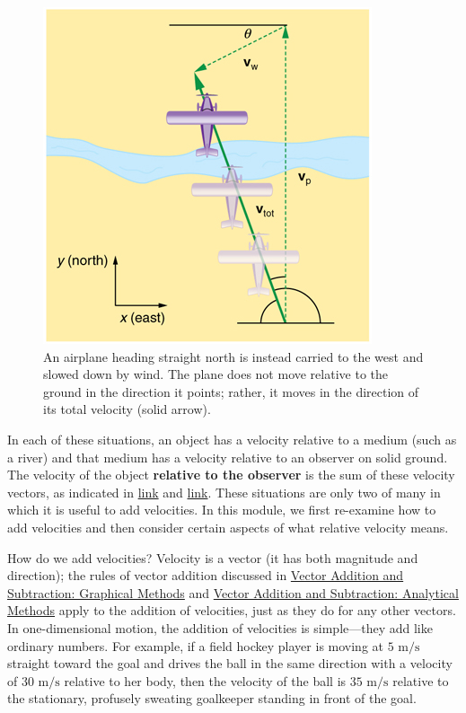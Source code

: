 \documentclass[
]{book}
\begin{document}
\begin{figure}
\hypertarget{import-auto-id1851600}{%
\centering
\includegraphics{images/Figure_03_05_02a.jpg}
\caption{An airplane heading straight north is instead carried to the west and
slowed down by wind. The plane does not move relative to the ground in
the direction it points; rather, it moves in the direction of its total
velocity (solid
arrow).}\label{import-auto-id1851600}
}
\end{figure}

In each of these situations, an object has a
\protect\hypertarget{import-auto-id1831655}{}{velocity} relative to a medium
(such as a river) and that medium has a velocity relative to an observer
on solid ground. The velocity of the object \textbf{relative to the observer}
is the sum of these velocity vectors, as indicated in
\protect\hyperlink{import-auto-id1635451}{link} and
\protect\hyperlink{import-auto-id1851600}{link}. These situations
are only two of many in which it is useful to add velocities. In this
module, we first re-examine how to add velocities and then consider
certain aspects of what relative velocity means.

How do we add velocities? Velocity is a vector (it has both magnitude
and direction); the rules of \protect\hypertarget{import-auto-id1402169}{}{vector addition} discussed in \href{/m54781}{Vector Addition and Subtraction:
Graphical Methods} and \href{/m54783}{Vector Addition and Subtraction:
Analytical Methods} apply to the addition of velocities, just
as they do for any other vectors. In one-dimensional motion, the
addition of velocities is simple---they add like ordinary numbers. For
example, if a field hockey player is moving at \(\text{5~m/s}{}\) straight
toward the goal and drives the ball in the same direction with a
velocity of \(\text{30~m/s}{}\) relative to her body, then the velocity of
the ball is \(\text{35~m/s}{}\) relative to the stationary, profusely
sweating goalkeeper standing in front of the goal.
\end{document}
